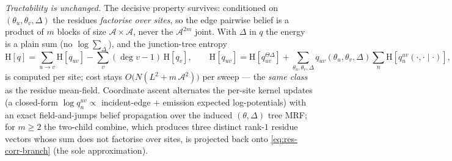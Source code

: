 \emph{Tractability is unchanged.} The decisive property survives: conditioned
on $(\theta_u,\theta_v,\Delta)$ the residues \emph{factorise over sites}, so the
edge pairwise belief is a product of $m$ blocks of size $\mathcal{A}\times
\mathcal{A}$, never the $\mathcal{A}^{2m}$ joint. With $\Delta$ in $q$ the energy
is a plain sum (no $\log\!\sum_\Delta$), and the junction-tree entropy
\begin{equation}
  \mathrm{H}[q] = \sum_{u\to v}\mathrm{H}[q_{uv}] - \sum_v(\deg v-1)\,\mathrm{H}[q_v],
  \qquad
  \mathrm{H}[q_{uv}] = \mathrm{H}[q_{uv}^{\Theta\Delta}]
     + \!\!\sum_{\theta_u,\theta_v,\Delta}\!\! q_{uv}(\theta_u,\theta_v,\Delta)
       \sum_n \mathrm{H}[q_n^{uv}(\cdot,\cdot\mid\cdot)],
  \label{eq:res-corr-entropy}
\end{equation}
is computed per site; cost stays $O\!\big(N(L^2 + m\,\mathcal{A}^2)\big)$ per
sweep --- the \emph{same class} as the residue mean-field. Coordinate ascent
alternates the per-site kernel updates (a closed-form
$\log q_n^{uv}\!\propto\!$ incident-edge $+$ emission expected log-potentials)
with an exact field-and-jumps belief propagation over the induced $(\theta,
\Delta)$ tree MRF; for $m\ge2$ the two-child combine, which produces three
distinct rank-$1$ residue vectors whose sum does not factorise over sites, is
projected back onto \eqref{eq:res-corr-branch} (the sole approximation).

